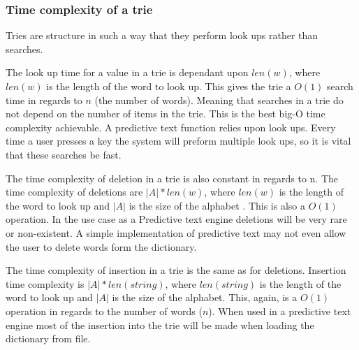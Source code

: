\documentclass[10pt]{article} %
\begin{document}
			\subsubsection{Time complexity of a trie}
			    Tries are structure in such a way that they perform look ups rather than searches.
			
				The look up time for a value in a trie is dependant upon \begin{math}len(w)\end{math}, where \begin{math}len(w)\end{math} is the length of the word to look up\cite{book:ADS:complexity}. This gives the trie a \begin{math} O(1) \end{math} search time in regards to \begin{math} n \end{math} (the number of words). Meaning that searches in a trie do not depend on the number of items in the trie. This is the best big-O time complexity achievable. A predictive text function relies upon look ups. Every time a user presses a key the system will preform multiple look ups, so it is vital that these searches be fast. 
				
				The time complexity of deletion in a trie is also constant in regards to n. The time complexity of deletions are \begin{math}\vert A \vert * len(w)\end{math}, where \begin{math}len(w)\end{math} is the length of the word to look up and \begin{math}\vert A \vert \end{math} is the size of the alphabet \cite{book:ADS:complexity}.
				This is also a \begin{math} O(1) \end{math} operation.
				In the use case as a Predictive text engine deletions will be very rare or non-existent.
				A simple implementation of predictive text may not even allow the user to delete words form the dictionary. 
				
				The time complexity of insertion in a trie is the same as for deletions. Insertion time complexity is \begin{math}\vert A \vert  * len(string)\end{math}, where \begin{math}len(string)\end{math} is the length of the word to look up and \begin{math}\vert A \vert \end{math} is the size of the alphabet\cite{book:ADS:complexity}.
				This, again, is a \begin{math} O(1) \end{math} operation in regards to the number of words (\begin{math}n\end{math}).
				When used in a predictive text engine most of the insertion into the trie will be made when loading the dictionary from file. 
				
\end{document}
